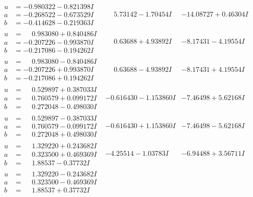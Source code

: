 \documentclass[1p]{elsarticle_modified}
\theoremstyle{definition}
\begin{document}
$$\begin{array}{c|c|c}
\begin{aligned}
u &= -0.980322 - 0.821398 I \\
a &= -0.268522 - 0.673529 I \\
b &= -0.414628 - 0.219363 I\end{aligned}
 & \phantom{-}5.73142 - 1.70454 I & -14.08727 + 0.46304 I \\ \hline\begin{aligned}
u &= \phantom{-}0.983080 + 0.840486 I \\
a &= -0.207226 - 0.993870 I \\
b &= -0.217086 - 0.194262 I\end{aligned}
 & \phantom{-}0.63688 + 4.93892 I & -8.17431 - 4.19554 I \\ \hline\begin{aligned}
u &= \phantom{-}0.983080 - 0.840486 I \\
a &= -0.207226 + 0.993870 I \\
b &= -0.217086 + 0.194262 I\end{aligned}
 & \phantom{-}0.63688 - 4.93892 I & -8.17431 + 4.19554 I \\ \hline\begin{aligned}
u &= \phantom{-}0.529897 + 0.387033 I \\
a &= \phantom{-}0.760579 + 0.099172 I \\
b &= \phantom{-}0.272048 - 0.498030 I\end{aligned}
 & -0.616430 - 1.153860 I & -7.46498 + 5.62168 I \\ \hline\begin{aligned}
u &= \phantom{-}0.529897 - 0.387033 I \\
a &= \phantom{-}0.760579 - 0.099172 I \\
b &= \phantom{-}0.272048 + 0.498030 I\end{aligned}
 & -0.616430 + 1.153860 I & -7.46498 - 5.62168 I \\ \hline\begin{aligned}
u &= \phantom{-}1.329220 + 0.243682 I \\
a &= \phantom{-}0.323500 + 0.469369 I \\
b &= \phantom{-}1.88537 - 0.37732 I\end{aligned}
 & -4.25514 - 1.03783 I & -6.94488 + 3.56711 I \\ \hline\begin{aligned}
u &= \phantom{-}1.329220 - 0.243682 I \\
a &= \phantom{-}0.323500 - 0.469369 I \\
b &= \phantom{-}1.88537 + 0.37732 I\end{aligned}

\end{array}$$
\end{document}
